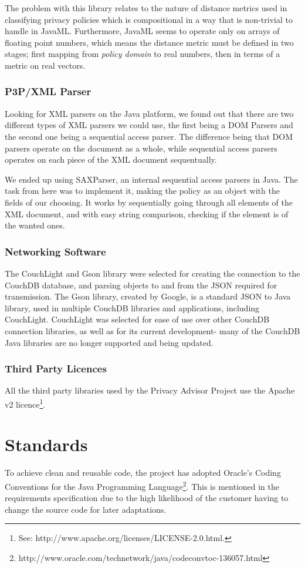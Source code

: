 The problem with this library relates to the nature of distance metrics used in classifying privacy policies which is compositional in a way that is non-trivial to handle in JavaML. Furthermore, JavaML seems to operate only on arrays of floating point numbers, which means the distance metric must be defined in two stages; first mapping from \emph{policy domain} to real numbers, then in terms of a metric on real vectors.

\subsubsection{P3P/XML Parser}
Looking for XML parsers on the Java platform, we found out that there are two different types of XML parsers we could use, the first being a DOM Parsers and the second one being a sequential access parser. The difference being that DOM parsers operate on the document as a whole, while sequential access parsers operates on each piece of the XML document sequentually.

We ended up using SAXParser, an internal sequential access parsers in Java. The task from here was to implement it, making the policy as an object with the fields of our choosing. It works by sequentially going through all elements of the XML document, and with easy string comparison, checking if the element is of the wanted ones.

\subsubsection{Networking Software}
The CouchLight and Gson library were selected for creating the connection to the CouchDB database, and parsing objects to and from the JSON required for transmission. The Gson library, created by Google, is a standard JSON to Java library, used in multiple CouchDB libraries and applications, including CouchLight. CouchLight was selected for ease of use over other CouchDB connection libraries, as well as for its current development- many of the CouchDB Java libraries are no longer supported and being updated.

\subsubsection{Third Party Licences}
All the third party libraries used by the Privacy Advisor Project use the Apache v2 licence\footnote{See: http://www.apache.org/licenses/LICENSE-2.0.html.}.


\section{Standards}
To achieve clean and reusable code, the project has adopted Oracle's Coding Conventions for the Java Programming Language\footnote{http://www.oracle.com/technetwork/java/codeconvtoc-136057.html}. This is mentioned in the requirements specification due to the high likelihood of the customer having to change the source code for later adaptations.
